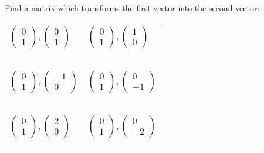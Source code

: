 \documentclass[fontsize=20pt]{scrartcl}
\begin{document}
\newpage
Find a matrix which transforms the first vector into the second vector:
\newline
\newline
\begin{tabular}{p{13cm}p{13cm}}
$\begin{pmatrix}0\\1\end{pmatrix}, \begin{pmatrix}0\\1\end{pmatrix}$
&$\begin{pmatrix}0\\1\end{pmatrix}, \begin{pmatrix}1\\0\end{pmatrix}$
\\\\\\
\\\\\\

$\begin{pmatrix}0\\1\end{pmatrix}, \begin{pmatrix}-1\\0\end{pmatrix}$
&$\begin{pmatrix}0\\1\end{pmatrix}, \begin{pmatrix}0\\-1\end{pmatrix}$
\\\\\\
\\\\\\

$\begin{pmatrix}0\\1\end{pmatrix}, \begin{pmatrix}2\\0\end{pmatrix}$
&$\begin{pmatrix}0\\1\end{pmatrix}, \begin{pmatrix}0\\-2\end{pmatrix}$
\\\\\\
\end{tabular}
\end{document}
